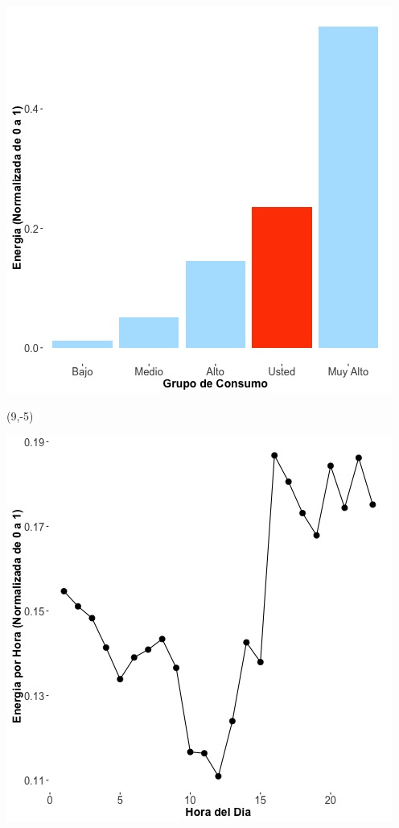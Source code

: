 \documentclass{article}\usepackage[]{graphicx}\usepackage[]{color}
\newenvironment{knitrout}{}{} %
\begin{document}
\begin{knitrout}
\color{fgcolor}
\includegraphics[scale=0.65]{figure/A21_neighbor_plot} 
\end{knitrout}

 \begin{textblock}{1}(9,-5)
\begin{minipage}{20em}
\begingroup

\endgroup
\end{minipage}
\end{textblock}


\begin{knitrout}
\color{fgcolor}
\includegraphics[scale=0.65]{figure/A21_plot_norm_median} 
\end{knitrout}
\end{document}
